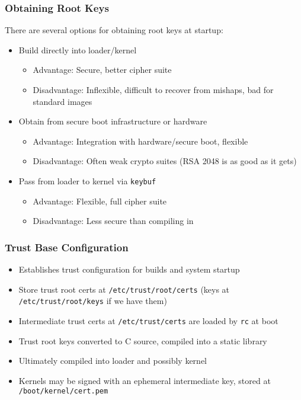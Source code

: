 \documentclass{beamer}
\begin{document}
\begin{frame}
  \frametitle{Obtaining Root Keys}
  There are several options for obtaining root keys at startup:
  \begin{itemize}
  \item Build directly into loader/kernel
    \begin{itemize}
    \item Advantage: Secure, better cipher suite
    \item Disadvantage: Inflexible, difficult to recover from mishaps,
      bad for standard images
    \end{itemize}
  \item Obtain from secure boot infrastructure or hardware
    \begin{itemize}
    \item Advantage: Integration with hardware/secure boot, flexible
    \item Disadvantage: Often weak crypto suites (RSA 2048 is as good
      as it gets)
    \end{itemize}
  \item Pass from loader to kernel via \texttt{keybuf}
    \begin{itemize}
    \item Advantage: Flexible, full cipher suite
    \item Disadvantage: Less secure than compiling in
    \end{itemize}
  \end{itemize}
\end{frame}

\begin{frame}
  \frametitle{Trust Base Configuration}
  \begin{itemize}
  \item Establishes trust configuration for builds and system startup
  \item Store trust root certs at \texttt{/etc/trust/root/certs} (keys
    at \texttt{/etc/trust/root/keys} if we have them)
  \item Intermediate trust certs at \texttt{/etc/trust/certs} are
    loaded by \texttt{rc} at boot
  \item Trust root keys converted to C source, compiled into a static library
  \item Ultimately compiled into loader and possibly kernel
  \item Kernels may be signed with an ephemeral intermediate key,
    stored at \texttt{/boot/kernel/cert.pem}
  \end{itemize}
\end{frame}
\end{document}
